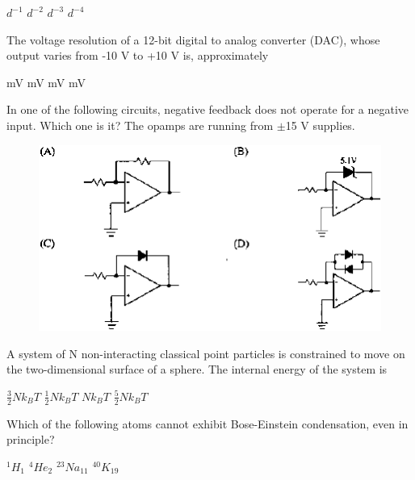 \documentclass{exam}
\begin{document}
\begin{questions}
\begin{oneparchoices}
	\choice $d^{-1}$ \choice $d^{-2}$ \choice $d^{-3}$ \choice $d^{-4}$
\end{oneparchoices}

\question The voltage resolution of a 12-bit digital to analog converter (DAC), whose output varies from -10 V to +10 V is, approximately\hfill{}

\begin{oneparchoices}
	 mV  mV  mV  mV
\end{oneparchoices}

\question In one of the following circuits, negative feedback does not operate for a negative input. Which one is it? The opamps are running from $\pm$15 V supplies.\hfill{}
\begin{figure}[H]
	\centering
	\caption*{} \label{20} \includegraphics[width=0.9\columnwidth]{pics/20.png}
\end{figure}

\question A system of N non-interacting classical point particles is constrained to move on the two-dimensional surface of a sphere. The internal energy of the system is\hfill{}

\begin{oneparchoices}
	\choice $\frac{3}{2}Nk_{B}T$ \choice $\frac{1}{2}Nk_{B}T$ \choice $Nk_{B}T$ \choice $\frac{5}{2}Nk_{B}T$
\end{oneparchoices}

\question Which of the following atoms cannot exhibit Bose-Einstein condensation, even in principle?\hfill{}

\begin{oneparchoices}
	\choice $^{1}H_{1}$ \choice $^{4}He_{2}$ \choice $^{23}Na_{11}$ \choice $^{40}K_{19}$
\end{oneparchoices}


\end{questions}
\end{document}

